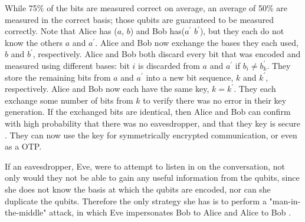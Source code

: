 While 75\% of the bits are measured correct on average, an average of 50\% are measured in the correct basis; those qubits are  guaranteed to be measured correctly.
Note that Alice has ($a$, $b$) and Bob has($a^\prime$ $b^\prime$), but they each do not know the others $a$ and $a^\prime$.
Alice and Bob now exchange the bases they each used, $b$ and $b^\prime$, respectively.
Alice and Bob both discard every bit that was encoded and measured using different bases: bit $i$ is discarded from $a$ and $a^\prime$ if $b_i \neq b^\prime_k$.
They store the remaining bits from $a$ and $a^\prime$ into a new bit sequence, $k$ and $k^\prime$, respectively.
Alice and Bob now each have the same key, $k = k^\prime$.
They each exchange some number of bits from $k$ to verify there was no error in their key generation.
If the exchanged bits are identical, then Alice and Bob can confirm with high probability that there was no eavesdropper, and that they key is secure \cite{MikeAndIke}.
They can now use the key for symmetrically encrypted communication, or even as a OTP.

If an eavesdropper, Eve, were to attempt to listen in on the conversation, not only would they not be able to gain any useful information from the qubits, since she does not know the basis at which the qubits are encoded, nor can she duplicate the qubits. 
Therefore the only strategy she has is to perform a "man-in-the-middle" attack, in which Eve impersonates Bob to Alice and Alice to Bob \cite{qc:agi}.

